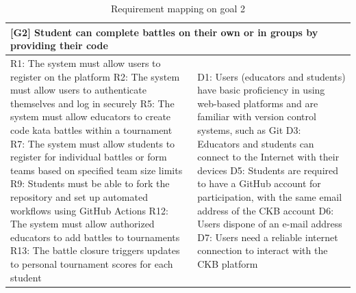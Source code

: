 \begin{table}[h!]
    \centering
    \begin{tabular}{|p{8cm}|p{8cm}|}
    \hline
        \multicolumn{2}{|p{16cm}|}{\textbf{[G2] Student can complete battles on their own or in groups by providing their code}} \\
    \hline
        R1: The system must allow users to register on the platform \newline
        R2: The system must allow users to authenticate themselves and log in securely \newline
        R5: The system must allow educators to create code kata battles within a tournament \newline
        R7: The system must allow students to register for individual battles or form teams based on specified team size limits \newline
        R9: Students must be able to fork the repository and set up automated workflows using GitHub Actions \newline
        R12: The system must allow authorized educators to add battles to tournaments \newline 
        R13: The battle closure triggers updates to personal tournament scores for each student 
        &
        D1: Users (educators and students) have basic proficiency in using web-based platforms and are familiar with version control systems, such as Git \newline 
        D3: Educators and students can connect to the Internet with their devices \newline
        D5: Students are required to have a GitHub account for participation, with the same email address of the CKB account \newline
        D6: Users dispone of an e-mail address \newline
        D7: Users need a reliable internet connection to interact with the CKB platform\newline
        \\
    \hline
    \end{tabular}
    \caption{Requirement mapping on goal 2}
    \label{tab:g2}
\end{table}

